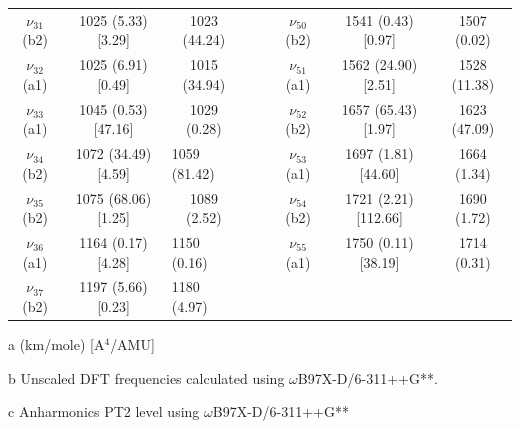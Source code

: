 \begin{table}[H]
\begin{center}
\begin{threeparttable}
{\begin{tabular}{c c c c c c c c}
$\nu_{31}$ (b2) & 1025 (5.33) [3.29] & 1023 (44.24) &  &  & $\nu_{50}$ (b2) &    1541 (0.43) [0.97] & 1507 (0.02) \\ 
$\nu_{32}$ (a1)& 1025 (6.91) [0.49] & 1015 (34.94) &  &  & $\nu_{51}$ (a1) & 1562 (24.90) [2.51] & 1528 (11.38) \\ 
$\nu_{33}$ (a1) & 1045 (0.53) [47.16] & 1029 (0.28) &  &  & $\nu_{52}$ (b2) & 1657 (65.43) [1.97] & 1623 (47.09) \\ 
$\nu_{34}$ (b2) & 1072 (34.49) [4.59] & \multicolumn{1}{l}{1059 (81.42)} &  &  & $\nu_{53}$ (a1) & 1697 (1.81) [44.60] & 1664 (1.34) \\ 
$\nu_{35}$ (b2)  & 1075 (68.06) [1.25] & 1089 (2.52) &  &  &   $\nu_{54}$ (b2) & 1721 (2.21) [112.66] & 1690 (1.72) \\ 
$\nu_{36}$ (a1) & 1164 (0.17) [4.28] & \multicolumn{1}{l}{1150 (0.16)} &  &  &   $\nu_{55}$ (a1) & 1750 (0.11) [38.19] & 1714 (0.31) \\ 
$\nu_{37}$ (b2) & 1197 (5.66) [0.23] & \multicolumn{1}{l}{1180 (4.97)} &  &  & \multicolumn{1}{l}{} &  &  \\ 
	\bottomrule
\end{tabular}}

\begin{tablenotes}
	\item[a] (km/mole) [A$^{4}$/AMU]
	\item[b] Unscaled DFT frequencies calculated using $\omega$B97X-D/6-311++G**.
	\item[c] Anharmonics PT2 level using $\omega$B97X-D/6-311++G** 
\end{tablenotes}
\end{threeparttable}
\end{center}
\label{freq-Tribenzofuran}
\end{table}





